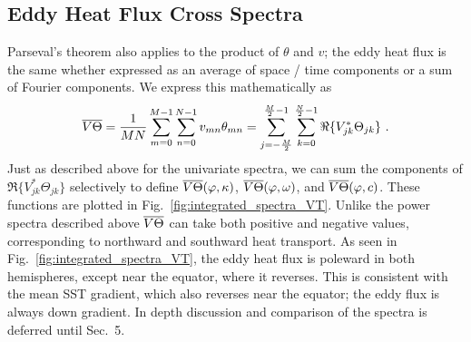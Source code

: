 \documentclass[10pt]{article}
\newcommand{\ol}{\ensuremath{\overline}}
\begin{document}
\subsection{Eddy Heat Flux Cross Spectra}

Parseval's theorem also applies to the product of $\theta$ and $v$; the eddy heat flux is the same whether expressed as an average of space / time components or a sum of Fourier components. We express this mathematically as
\begin{equation}
\ol{V\Theta} = \frac{1}{MN} \sum_{m=0}^{M-1} \sum_{n=0}^{N-1} v_{mn} \theta_{mn} = \sum_{j=-\frac{M}{2}}^{\frac{M}{2}-1} \sum_{k=0}^{\frac{N}{2}-1} \Re \{ V_{jk}^\ast  \Theta_{jk} \} \ .
\end{equation}
Just as described above for the univariate spectra, we can sum the components of $\Re \{ V_{jk}^\ast  \Theta_{jk} \}$ selectively to define $\ol{V\Theta}(\varphi, \kappa)$, $\ol{V\Theta}(\varphi, \omega)$, and $\ol{V\Theta}(\varphi, c)$. These functions are plotted in  Fig.~\ref{fig:integrated_spectra_VT}. Unlike the power spectra described above $\ol{V\Theta}$ can take both positive and negative values, corresponding to northward and southward heat transport. As seen in Fig.~\ref{fig:integrated_spectra_VT}, the eddy heat flux is poleward in both hemispheres, except near the equator, where it reverses. This is consistent with the mean SST gradient, which also reverses near the equator; the eddy flux is always down gradient. In depth discussion and comparison of the spectra is deferred until Sec.~5.  %
\end{document}

